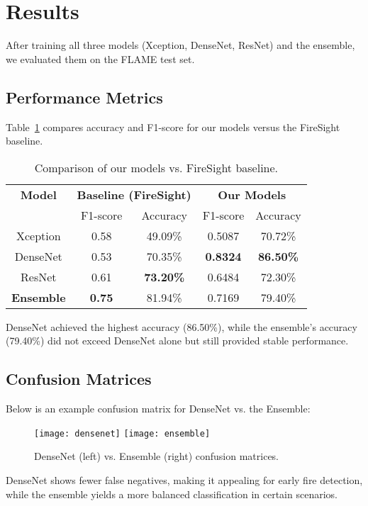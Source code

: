 \section{Results}
\label{sec:results}

After training all three models (Xception, DenseNet, ResNet) and the ensemble, we
evaluated them on the FLAME test set.

\subsection{Performance Metrics}
\label{subsec:performance-metrics}

Table~\ref{tab:results} compares accuracy and F1-score for our models versus the FireSight
baseline.

\begin{table}[h]
\centering
\begin{tabular}{|c|c|c|c|c|}
\hline
\textbf{Model} & \multicolumn{2}{c|}{\textbf{Baseline (FireSight)}} & \multicolumn{2}{c|}{\textbf{Our Models}} \\
\cline{2-5}
 & F1-score & Accuracy & F1-score & Accuracy \\
\hline
Xception & 0.58 & 49.09\% & 0.5087 & 70.72\% \\
DenseNet & 0.53 & 70.35\% & \textbf{0.8324} & \textbf{86.50\%} \\
ResNet & 0.61 & \textbf{73.20\%} & 0.6484 & 72.30\% \\
\hline
\textbf{Ensemble} & \textbf{0.75} & 81.94\% & 0.7169 & 79.40\% \\
\hline
\end{tabular}
\caption{Comparison of our models vs. FireSight baseline.}
\label{tab:results}
\end{table}

DenseNet achieved the highest accuracy (86.50\%), while the ensemble’s accuracy (79.40\%)
did not exceed DenseNet alone but still provided stable performance.

\subsection{Confusion Matrices}
\label{subsec:confusion-matrices}

Below is an example confusion matrix for DenseNet vs. the Ensemble:

\begin{figure}[h]
    \centering
    \texttt{[image: densenet]}
    \quad
    \texttt{[image: ensemble]}
    \caption{DenseNet (left) vs. Ensemble (right) confusion matrices.}
    \label{fig:confmat}
\end{figure}

DenseNet shows fewer false negatives, making it appealing for early fire detection,
while the ensemble yields a more balanced classification in certain scenarios.
